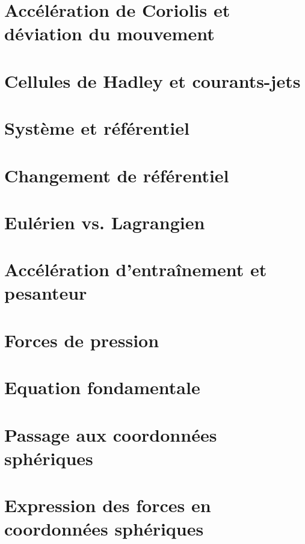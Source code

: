\documentclass[a4paper,DIV16,10pt]{scrartcl}
\begin{document}
 \inidoc

\newpage
\section{Accélération de Coriolis et déviation du mouvement}


\newpage
\section{Cellules de Hadley et courants-jets}


\begin{detail} 
\newpage
\section{Système et référentiel}
	
\section{Changement de référentiel}
	
\section{Eulérien vs. Lagrangien}
	
\section{Accélération d'entraînement et pesanteur}
	
\section{Forces de pression}
	
\end{detail}

	
\begin{detail}
\newpage
\section{Equation fondamentale}
	
\section{Passage aux coordonnées sphériques}
	
\section{Expression des forces en coordonnées sphériques}
	
\end{detail}
\end{document}
